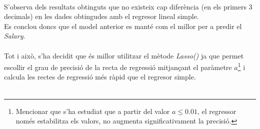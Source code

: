 \documentclass[a4paper, 11pt]{article}
\begin{document}
\\
S'observa dels resultats obtinguts que no existeix cap diferència (en els primers 3 decimals) en les dades obtingudes  amb el regresor lineal simple. \\
Es conclou doncs que el model anterior es manté com el millor per a predir el \textit{Salary}.\\\\
Tot i això, s'ha decidit que és millor utilitzar el mètode \textit{Lasso()} ja que permet escollir el grau de precisió de la recta de regressió mitjançant el paràmetre $a$\footnote{Mencionar que s'ha estudiat que a partir del valor $a\leq 0.01$, el regressor només estabilitza els valors, no augmenta significativament la precisió.} i calcula les rectes de regressió més ràpid que el regresor simple.\\\\
\newpage
\end{document}
